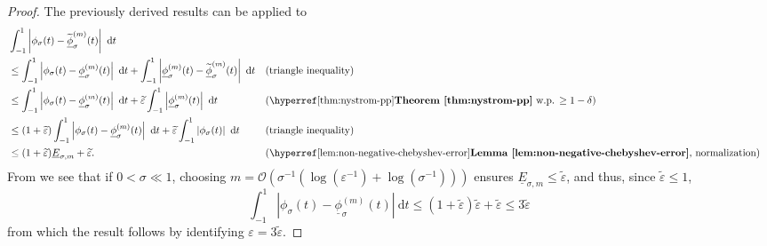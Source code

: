 \begin{proof}
    The previously derived results can be applied to
    \begin{align}
        &\int_{-1}^{1} \left| \phi_{\sigma}(t) - \widetilde{\underline{\phi}}_{\sigma}^{(m)}(t) \right|~\mathrm{d}t \notag \\
        &\leq \int_{-1}^{1} \left| \phi_{\sigma}(t) - \underline{\phi}_{\sigma}^{(m)}(t) \right|~\mathrm{d}t + \int_{-1}^{1} \left| \underline{\phi}_{\sigma}^{(m)}(t) - \widetilde{\underline{\phi}}_{\sigma}^{(m)}(t) \right|~\mathrm{d}t && \text{(triangle inequality)} \notag \\
        &\leq \int_{-1}^{1} \left| \phi_{\sigma}(t) - \underline{\phi}_{\sigma}^{(m)}(t) \right|~\mathrm{d}t + \widetilde{\varepsilon} \int_{-1}^{1} \left| \underline{\phi}_{\sigma}^{(m)}(t) \right|~\mathrm{d}t && \text{(\refthm{thm:nystrom-pp} w.p. $\geq 1 - \delta$)} \notag \\
        &\leq (1 + \widetilde{\varepsilon}) \int_{-1}^{1} \left| \phi_{\sigma}(t) - \underline{\phi}_{\sigma}^{(m)}(t) \right|~\mathrm{d}t + \widetilde{\varepsilon} \int_{-1}^{1} \left| \phi_{\sigma}(t) \right|~\mathrm{d}t && \text{(triangle inequality)} \notag \\
        &\leq (1 + \widetilde{\varepsilon}) \underline{E}_{\sigma, m} + \widetilde{\varepsilon}. && \text{(\reflem{lem:non-negative-chebyshev-error}, normalization)} \notag \\
    \end{align}
    From  we see that if $0 < \sigma \ll 1$, choosing $m = \mathcal{O}(\sigma^{-1}(\log(\varepsilon^{-1}) + \log(\sigma^{-1})))$ ensures $\underline{E}_{\sigma, m} \leq \widetilde{\varepsilon}$, and thus, since $\widetilde{\varepsilon} \leq 1$,
    \begin{equation}
        \int_{-1}^{1} \left| \phi_{\sigma}(t) - \underline{\phi}_{\sigma}^{(m)}(t) \right|~\mathrm{d}t \leq (1+\widetilde{\varepsilon}) \widetilde{\varepsilon} + \widetilde{\varepsilon} \leq 3 \widetilde{\varepsilon}
    \end{equation}
    from which the result follows by identifying $\varepsilon = 3 \widetilde{\varepsilon}$.
\end{proof}



